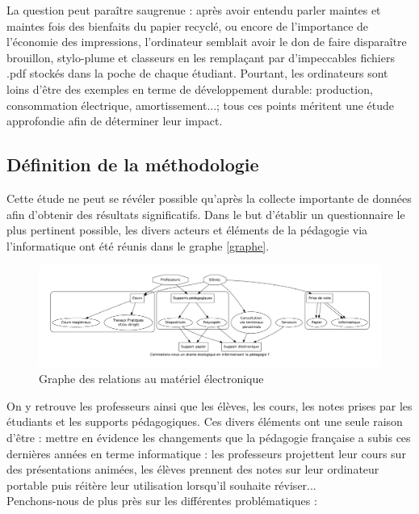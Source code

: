 \documentclass[a4paper,11pt,french]{article}
\begin{document}
La question peut paraître saugrenue : après avoir entendu parler maintes et maintes fois des bienfaits du papier recyclé, ou encore de l'importance de l'économie des impressions, l'ordinateur semblait avoir le don de faire disparaître brouillon, stylo-plume et classeurs en les remplaçant par d'impeccables fichiers .pdf stockés dans la poche de chaque étudiant. Pourtant, les ordinateurs sont loins d'être des exemples en terme de développement durable: production, consommation électrique, amortissement...; tous ces points méritent une étude approfondie afin de déterminer leur impact.\\

\subsection{Définition de la méthodologie}
Cette étude ne peut se révéler possible qu'après la collecte importante de données afin d'obtenir des résultats significatifs. Dans le but d'établir un questionnaire le plus pertinent possible, les divers acteurs et éléments de la pédagogie via l'informatique ont été réunis dans le graphe \vref{graphe}.\\

\begin{figure}[h!]
\includegraphics[width=\textwidth]{graphe.png}
\caption{Graphe des relations au matériel électronique}
\label{graphe}
\end{figure}

On y retrouve les professeurs ainsi que les élèves, les cours, les notes prises par les étudiants et les supports pédagogiques. Ces divers éléments ont une seule raison d'être : mettre en évidence les changements que la pédagogie française a subis ces dernières années en terme informatique : les professeurs projettent leur cours sur des présentations animées, les élèves prennent des notes sur leur ordinateur portable puis réitère leur utilisation lorsqu'il souhaite réviser...\\

Penchons-nous de plus près sur les différentes problématiques :
\end{document}
